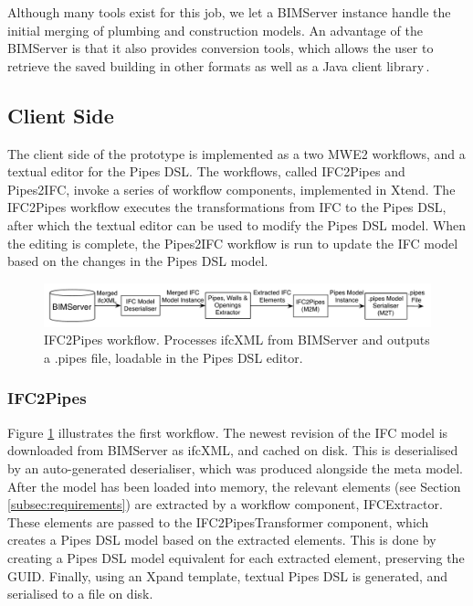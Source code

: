 Although many tools exist for this job, we let a BIMServer instance handle the initial merging of plumbing and construction models. An advantage of the BIMServer is that it also provides conversion tools, which allows the user to retrieve the saved building in other formats as well as a Java client library\,\cite{beetz10}.

\subsection{Client Side}
The client side of the prototype is implemented as a two MWE2 workflows, and a textual editor for the Pipes DSL. The workflows, called IFC2Pipes and Pipes2IFC, invoke a series of workflow components, implemented in Xtend. The IFC2Pipes workflow executes the transformations from IFC to the Pipes DSL, after which the textual editor can be used to modify the Pipes DSL model. When the editing is complete, the Pipes2IFC workflow is run to update the IFC model based on the changes in the Pipes DSL model.

\begin{figure}[t]
    \centering
        \includegraphics[width=114mm]{images/IFC2Pipes.pdf}
    \caption{IFC2Pipes workflow. Processes ifcXML from BIMServer and outputs a .pipes file, loadable in the Pipes DSL editor.}
    \label{fig:IFC2PipesWorkflow}
\end{figure}
\subsubsection{IFC2Pipes}
Figure \ref{fig:IFC2PipesWorkflow} illustrates the first workflow. The newest revision of the IFC model is downloaded from BIMServer as ifcXML, and cached on disk. This is deserialised by an auto-generated deserialiser, which was produced alongside the meta model. After the model has been loaded into memory, the relevant elements (see Section \ref{subsec:requirements}) are extracted by a workflow component, IFCExtractor. These elements are passed to the IFC2PipesTransformer component, which creates a Pipes DSL model based on the extracted elements. This is done by creating a Pipes DSL model equivalent for each extracted element, preserving the GUID. Finally, using an Xpand template, textual Pipes DSL is generated, and serialised to a file on disk.

